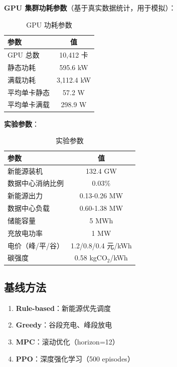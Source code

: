 \documentclass[12pt,a4paper]{article}
\begin{document}
\textbf{GPU 集群功耗参数}（基于真实数据统计，用于模拟）：

\begin{table}[h]
\centering
\caption{GPU 功耗参数}
\label{tab:gpu-power}
\begin{tabular}{@{}lc@{}}
\toprule
\textbf{参数} & \textbf{值} \\
\midrule
GPU 总数 & 10,412 卡 \\
静态功耗 & 595.6 kW \\
满载功耗 & 3,112.4 kW \\
平均单卡静态 & 57.2 W \\
平均单卡满载 & 298.9 W \\
\bottomrule
\end{tabular}
\end{table}

\textbf{实验参数}：

\begin{table}[h]
\centering
\caption{实验参数}
\label{tab:params}
\begin{tabular}{@{}lc@{}}
\toprule
\textbf{参数} & \textbf{值} \\
\midrule
新能源装机 & 132.4 GW \\
数据中心消纳比例 & 0.03\% \\
新能源出力 & 0.13-0.26 MW \\
数据中心负载 & 0.60-1.38 MW \\
储能容量 & 5 MWh \\
充放电功率 & 1 MW \\
电价（峰/平/谷） & 1.2/0.8/0.4 元/kWh \\
碳强度 & 0.58 kgCO$_2$/kWh \\
\bottomrule
\end{tabular}
\end{table}

\subsection{基线方法}

\begin{enumerate}
    \item \textbf{Rule-based}：新能源优先调度
    \item \textbf{Greedy}：谷段充电、峰段放电
    \item \textbf{MPC}：滚动优化（horizon=12）
    \item \textbf{PPO}：深度强化学习（500 episodes）
\end{enumerate}
\end{document}
